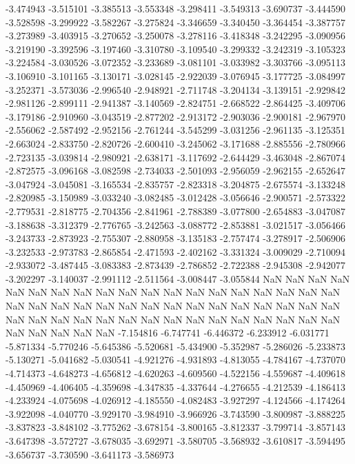 -3.474943
-3.515101
-3.385513
-3.553348
-3.298411
-3.549313
-3.690737
-3.444590
-3.528598
-3.299922
-3.582267
-3.275824
-3.346659
-3.340450
-3.364454
-3.387757
-3.273989
-3.403915
-3.270652
-3.250078
-3.278116
-3.418348
-3.242295
-3.090956
-3.219190
-3.392596
-3.197460
-3.310780
-3.109540
-3.299332
-3.242319
-3.105323
-3.224584
-3.030526
-3.072352
-3.233689
-3.081101
-3.033982
-3.303766
-3.095113
-3.106910
-3.101165
-3.130171
-3.028145
-2.922039
-3.076945
-3.177725
-3.084997
-3.252371
-3.573036
-2.996540
-2.948921
-2.711748
-3.204134
-3.139151
-2.929842
-2.981126
-2.899111
-2.941387
-3.140569
-2.824751
-2.668522
-2.864425
-3.409706
-3.179186
-2.910960
-3.043519
-2.877202
-2.913172
-2.903036
-2.900181
-2.967970
-2.556062
-2.587492
-2.952156
-2.761244
-3.545299
-3.031256
-2.961135
-3.125351
-2.663024
-2.833750
-2.820726
-2.600410
-3.245062
-3.171688
-2.885556
-2.780966
-2.723135
-3.039814
-2.980921
-2.638171
-3.117692
-2.644429
-3.463048
-2.867074
-2.872575
-3.096168
-3.082598
-2.734033
-2.501093
-2.956059
-2.962155
-2.652647
-3.047924
-3.045081
-3.165534
-2.835757
-2.823318
-3.204875
-2.675574
-3.133248
-2.820985
-3.150989
-3.033240
-3.082485
-3.012428
-3.056646
-2.900571
-2.573322
-2.779531
-2.818775
-2.704356
-2.841961
-2.788389
-3.077800
-2.654883
-3.047087
-3.188638
-3.312379
-2.776765
-3.242563
-3.088772
-2.853881
-3.021517
-3.056466
-3.243733
-2.873923
-2.755307
-2.880958
-3.135183
-2.757474
-3.278917
-2.506906
-3.232533
-2.973783
-2.865854
-2.471593
-2.402162
-3.331324
-3.009029
-2.710094
-2.933072
-3.487445
-3.083383
-2.873439
-2.786852
-2.722388
-2.945308
-2.942077
-3.202297
-3.140037
-2.991112
-2.511564
-3.008447
-3.055844
NaN
NaN
NaN
NaN
NaN
NaN
NaN
NaN
NaN
NaN
NaN
NaN
NaN
NaN
NaN
NaN
NaN
NaN
NaN
NaN
NaN
NaN
NaN
NaN
NaN
NaN
NaN
NaN
NaN
NaN
NaN
NaN
NaN
NaN
NaN
NaN
NaN
NaN
NaN
NaN
NaN
NaN
NaN
NaN
NaN
NaN
NaN
NaN
NaN
NaN
NaN
NaN
NaN
NaN
-7.154816
-6.747741
-6.446372
-6.233912
-6.031771
-5.871334
-5.770246
-5.645386
-5.520681
-5.434900
-5.352987
-5.286026
-5.233873
-5.130271
-5.041682
-5.030541
-4.921276
-4.931893
-4.813055
-4.784167
-4.737070
-4.714373
-4.648273
-4.656812
-4.620263
-4.609560
-4.522156
-4.559687
-4.409618
-4.450969
-4.406405
-4.359698
-4.347835
-4.337644
-4.276655
-4.212539
-4.186413
-4.233924
-4.075698
-4.026912
-4.185550
-4.082483
-3.927297
-4.124566
-4.174264
-3.922098
-4.040770
-3.929170
-3.984910
-3.966926
-3.743590
-3.800987
-3.888225
-3.837823
-3.848102
-3.775262
-3.678154
-3.800165
-3.812337
-3.799714
-3.857143
-3.647398
-3.572727
-3.678035
-3.692971
-3.580705
-3.568932
-3.610817
-3.594495
-3.656737
-3.730590
-3.641173
-3.586973
